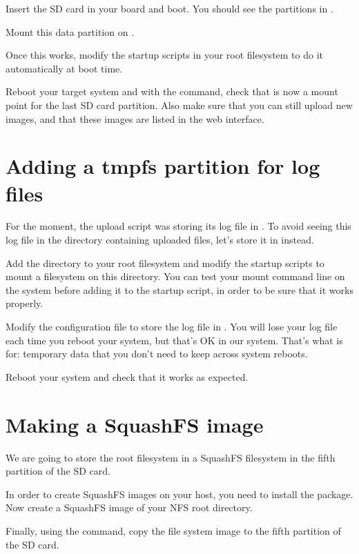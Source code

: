 Insert the SD card in your board and boot. You should see the
partitions in .

Mount this data partition on .

Once this works, modify the startup scripts in your root filesystem
to do it automatically at boot time.

Reboot your target system and with the  command, check that
 is now a mount point for the last SD card
partition. Also make sure that you can still upload new images, and
that these images are listed in the web interface.

\section{Adding a tmpfs partition for log files}

For the moment, the upload script was storing its log file in
. To avoid seeing this log file in
the directory containing uploaded files, let's store it in
 instead.

Add the  directory to your root filesystem and modify
the startup scripts to mount a  filesystem on this
directory. You can test your  mount command line on the
system before adding it to the startup script, in order to be sure
that it works properly.

Modify the  configuration file to store
the log file in . You will lose your log
file each time you reboot your system, but that's OK in our
system. That's what  is for: temporary data that you don't need
to keep across system reboots.

Reboot your system and check that it works as expected.

\section{Making a SquashFS image}

We are going to store the root filesystem in a SquashFS filesystem in
the fifth partition of the SD card.

In order to create SquashFS images on your host, you need to install
the  package. Now create a SquashFS image of your
NFS root directory.

Finally, using the  command, copy the file system image to
the fifth partition of the SD card.

